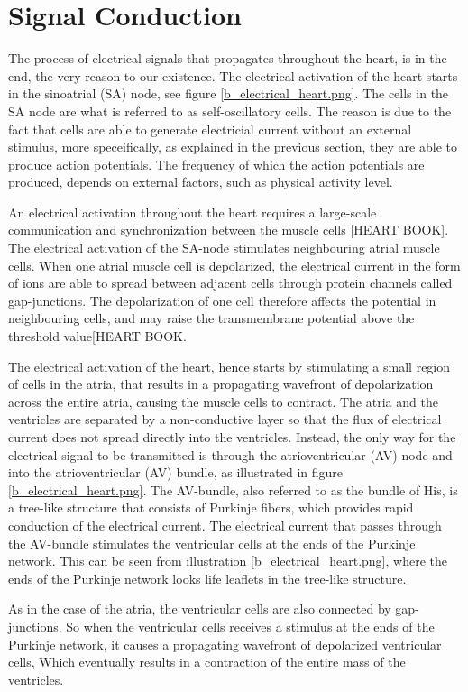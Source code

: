 \section{Signal Conduction}
The process of electrical signals that propagates throughout the heart, is in the end, the very reason to our existence. The electrical activation of the heart starts in the sinoatrial (SA) node, see figure \ref{b_electrical_heart.png}. The cells in the SA node are what is referred to as self-oscillatory cells. The reason is due to the fact that cells are able to generate electricial current without an external stimulus, more speceifically, as explained in the previous section, they are able to produce action potentials. The frequency of which the action potentials are produced, depends on external factors, such as physical activity level. 

An electrical activation throughout the heart requires a large-scale communication and synchronization between the muscle cells [HEART BOOK]. The electrical activation of the SA-node stimulates neighbouring atrial muscle cells. When one atrial muscle cell is depolarized, the electrical current in the form of ions are able to spread between adjacent cells through protein channels called gap-junctions. The depolarization of one cell therefore affects the potential in neighbouring cells, and may raise the transmembrane potential above the threshold value[HEART BOOK. 

The electrical activation of the heart, hence starts by stimulating a small region of cells in the atria, that results in a propagating wavefront of depolarization across the entire atria, causing the muscle cells to contract. The atria and the ventricles are separated by a non-conductive layer so that the flux of electrical current does not spread directly into the ventricles. Instead, the only way for the electrical signal to be transmitted is through the atrioventricular (AV) node and into the atrioventricular (AV) bundle, as illustrated in figure \ref{b_electrical_heart.png}. The AV-bundle, also referred to as the bundle of His, is a tree-like structure that consists of Purkinje fibers, which provides rapid conduction of the electrical current. The electrical current that passes through the AV-bundle stimulates the ventricular cells at the ends of the Purkinje network. This can be seen from illustration \ref{b_electrical_heart.png}, where the ends of the Purkinje network looks life leaflets in the tree-like structure.

 As in the case of the atria, the ventricular cells are also connected by gap-junctions. So when the ventricular cells receives a stimulus at the ends of the Purkinje network, it causes a propagating wavefront of depolarized ventricular cells, Which eventually results in a contraction of the entire mass of the ventricles.

